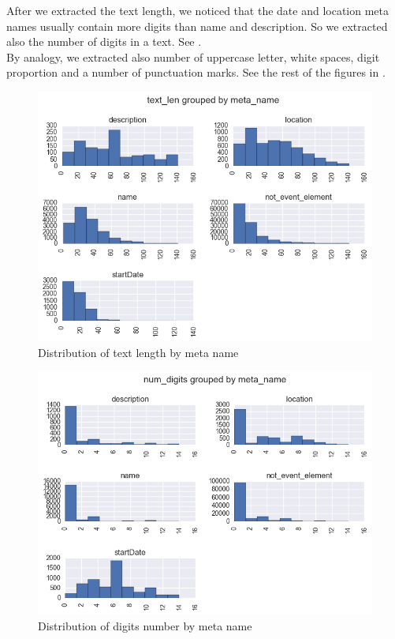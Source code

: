 After we extracted the text length, we noticed that the date and location meta names usually contain more digits than name and description. So we extracted also the number of digits in a text. See .\\

By analogy, we extracted also number of uppercase letter, white spaces, digit proportion and a number of punctuation marks. See the rest of the figures in .

\begin{figure}[h]
\begin{center}
\includegraphics[width=1.0\textwidth]{figures07/distrTextByMeta}
\caption{Distribution of text length by meta name}
\label{fig:distrTextByMeta}
\end{center}
\end{figure}

\begin{figure}[h]
\begin{center}
\includegraphics[width=1.0\textwidth]{figures07/distrDigitsByMeta}
\caption{Distribution of digits number by meta name}
\label{fig:distrDigitsByMeta}
\end{center}
\end{figure}


